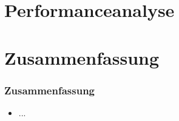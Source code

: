 \section{Performanceanalyse}


\section{Zusammenfassung}

\begin{frame}
	\frametitle{Zusammenfassung}
	\begin{itemize}
		\item ...
	\end{itemize}
\end{frame}



